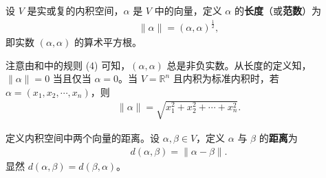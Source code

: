 \documentclass[../../main.tex]{subfiles}%
\begin{document}
\begin{definition}[范数]\label{definition:向量的长度或范数}
设 \(V\) 是实或复的内积空间，\(\alpha\) 是 \(V\) 中的向量，定义 \(\alpha\) 的\textbf{长度}（或\textbf{范数}）为
\begin{align*}
\|\alpha\|=(\alpha,\alpha)^{\frac{1}{2}},
\end{align*}
即实数 \((\alpha,\alpha)\) 的算术平方根。
\end{definition}
\begin{remark}
注意由和中的规则 (4) 可知，\((\alpha,\alpha)\) 总是非负实数。从长度的定义知，\(\|\alpha\| = 0\) 当且仅当 \(\alpha = 0\)。当 \(V=\mathbb{R}^n\) 且内积为标准内积时，若 \(\alpha=(x_1,x_2,\cdots,x_n)\)，则
\begin{align*}
\|\alpha\|=\sqrt{x_1^2 + x_2^2+\cdots + x_n^2}.
\end{align*}
\end{remark}

\begin{definition}[两个向量的距离]\label{definition:两个向量的距离}
定义内积空间中两个向量的距离。设 \(\alpha,\beta\in V\)，定义 \(\alpha\) 与 \(\beta\) 的\textbf{距离}为
\begin{align*}
d(\alpha,\beta)=\|\alpha - \beta\|.
\end{align*}
显然 \(d(\alpha,\beta)=d(\beta,\alpha)\)。
\end{definition}
\end{document}
